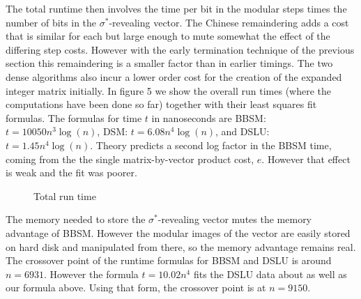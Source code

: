 \documentclass{acm_proc_article-sp}
\newcommand{\signature}{\ensuremath{\sigma^{*}}}
\begin{document}
The total runtime then involves the time per bit in the modular steps times the number
of bits in the \signature-revealing vector.  The Chinese remaindering adds a cost that
is similar for each but large enough to mute somewhat the effect of the differing step costs.
However with the early termination technique of the previous section this remaindering
is a smaller factor than in earlier timings.  
The two dense algorithms also incur a lower order
cost for the creation of the expanded integer matrix initially.
In figure 5 we show the overall run times (where the computations have been
done so far) together with their least squares fit formulas.
The formulas for time $t$ in nanoseconds are 
BBSM: $t = 10050 n^3 \log(n)$, %
DSM: $t = 6.08 n^4 \log(n)$, %
and DSLU: $t = 1.45 n^4 \log(n)$.%
Theory predicts a second log factor in the BBSM time, coming from the 
the single matrix-by-vector product cost, $e$.
However that effect is weak and the fit was poorer.
\begin{figure}[h]
\caption{Total run time}
\end{figure}

The memory needed to store the \signature-revealing vector mutes the memory 
advantage of BBSM.  However the modular images of the vector are easily stored on hard disk
and manipulated from there, so the memory advantage remains real.
The crossover point of the runtime formulas for BBSM and DSLU is around $n = 6931$. 
However the formula $t = 10.02 n^4$ fits the DSLU data about as well as our formula 
above.  Using that form, the crossover point is at $n = 9150$.




\end{document}
